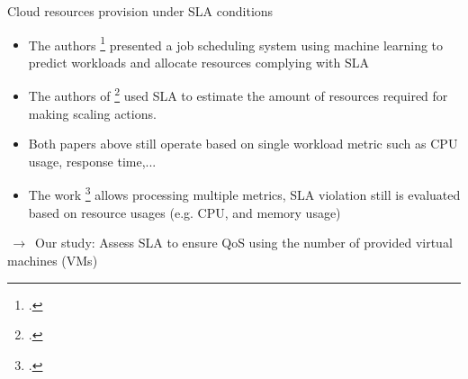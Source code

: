 \documentclass{beamer}
\begin{document}
\begin{frame}{Cloud resources provision under SLA conditions}
	\begin{itemize}
		\item{
			\small The authors \footcite{Reig et al. 2010} presented a job scheduling system using machine learning to predict workloads and allocate resources complying with SLA 
		}
		\item {
			\small The authors of \footcite{Souza et al. 2015} used SLA to estimate the amount of resources required for making scaling actions.
		}		
		\item{
			\small Both papers above still operate based on single workload metric such as CPU usage, response time,...
		}
		\item{
			\small The work \footcite{Tran et al. 2017} allows processing multiple metrics, SLA violation still is evaluated based on resource usages (e.g. CPU, and memory usage)
		}
	\end{itemize}
	$\,\to\,$ Our study: Assess SLA to ensure QoS using the number of provided virtual machines (VMs)
\end{frame}





\end{document}

